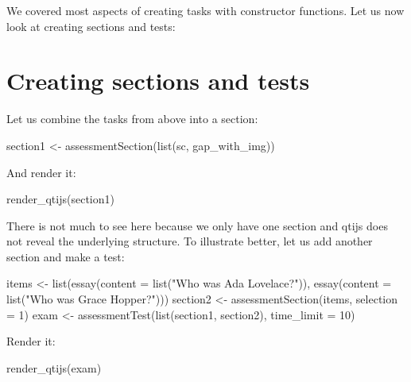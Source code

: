 \documentclass[twoside]{tufte-book}
\newenvironment{Shaded}{}{}
\newcommand{\AttributeTok}[1]{\textcolor[rgb]{0.49,0.56,0.16}{#1}}
\newcommand{\DecValTok}[1]{\textcolor[rgb]{0.25,0.63,0.44}{#1}}
\newcommand{\FunctionTok}[1]{\textcolor[rgb]{0.02,0.16,0.49}{#1}}
\newcommand{\NormalTok}[1]{#1}
\newcommand{\OtherTok}[1]{\textcolor[rgb]{0.00,0.44,0.13}{#1}}
\newcommand{\StringTok}[1]{\textcolor[rgb]{0.25,0.44,0.63}{#1}}
\begin{document}
We covered most aspects of creating tasks with constructor functions. Let us now look at creating sections and tests:

\section{Creating sections and tests}\label{creating-sections-and-tests}

Let us combine the tasks from above into a section:

\begin{Shaded}
\begin{Highlighting}[]
\NormalTok{section1 }\OtherTok{\textless{}{-}} \FunctionTok{assessmentSection}\NormalTok{(}\FunctionTok{list}\NormalTok{(sc, gap\_with\_img))}
\end{Highlighting}
\end{Shaded}

And render it:

\begin{Shaded}
\begin{Highlighting}[]
\FunctionTok{render\_qtijs}\NormalTok{(section1)}
\end{Highlighting}
\end{Shaded}

There is not much to see here because we only have one section and qtijs does not reveal the underlying structure. To illustrate better, let us add another section and make a test:

\begin{Shaded}
\begin{Highlighting}[]
\NormalTok{items }\OtherTok{\textless{}{-}} \FunctionTok{list}\NormalTok{(}\FunctionTok{essay}\NormalTok{(}\AttributeTok{content =} \FunctionTok{list}\NormalTok{(}\StringTok{"Who was Ada Lovelace?"}\NormalTok{)), }
              \FunctionTok{essay}\NormalTok{(}\AttributeTok{content =} \FunctionTok{list}\NormalTok{(}\StringTok{"Who was Grace Hopper?"}\NormalTok{)))}
\NormalTok{section2 }\OtherTok{\textless{}{-}} \FunctionTok{assessmentSection}\NormalTok{(items, }\AttributeTok{selection =} \DecValTok{1}\NormalTok{)}
\NormalTok{exam }\OtherTok{\textless{}{-}} \FunctionTok{assessmentTest}\NormalTok{(}\FunctionTok{list}\NormalTok{(section1, section2), }\AttributeTok{time\_limit =} \DecValTok{10}\NormalTok{)}
\end{Highlighting}
\end{Shaded}

Render it:

\begin{Shaded}
\begin{Highlighting}[]
\FunctionTok{render\_qtijs}\NormalTok{(exam)}
\end{Highlighting}
\end{Shaded}
\end{document}
